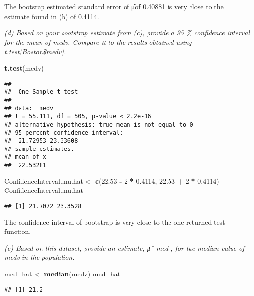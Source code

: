 \documentclass[]{article}
\newenvironment{Shaded}{\begin{snugshade}}{\end{snugshade}}
\newcommand{\KeywordTok}[1]{\textcolor[rgb]{0.13,0.29,0.53}{\textbf{#1}}}
\newcommand{\DecValTok}[1]{\textcolor[rgb]{0.00,0.00,0.81}{#1}}
\newcommand{\FloatTok}[1]{\textcolor[rgb]{0.00,0.00,0.81}{#1}}
\newcommand{\StringTok}[1]{\textcolor[rgb]{0.31,0.60,0.02}{#1}}
\newcommand{\OperatorTok}[1]{\textcolor[rgb]{0.81,0.36,0.00}{\textbf{#1}}}
\newcommand{\NormalTok}[1]{#1}
\begin{document}
The bootsrap estimated standard error of μ̂of 0.40881 is very close to
the estimate found in (b) of 0.4114.

\emph{(d) Based on your bootstrap estimate from (c), provide a 95 \%
confidence interval for the mean of medv. Compare it to the results
obtained using t.test(Boston\$medv).}

\begin{Shaded}
\begin{Highlighting}[]
\KeywordTok{t.test}\NormalTok{(medv)}
\end{Highlighting}
\end{Shaded}

\begin{verbatim}
## 
##  One Sample t-test
## 
## data:  medv
## t = 55.111, df = 505, p-value < 2.2e-16
## alternative hypothesis: true mean is not equal to 0
## 95 percent confidence interval:
##  21.72953 23.33608
## sample estimates:
## mean of x 
##  22.53281
\end{verbatim}

\begin{Shaded}
\begin{Highlighting}[]
\NormalTok{ConfidenceInterval.mu.hat <-}\StringTok{ }\KeywordTok{c}\NormalTok{(}\FloatTok{22.53} \OperatorTok{-}\StringTok{ }\DecValTok{2} \OperatorTok{*}\StringTok{ }\FloatTok{0.4114}\NormalTok{, }\FloatTok{22.53} \OperatorTok{+}\StringTok{ }\DecValTok{2} \OperatorTok{*}\StringTok{ }\FloatTok{0.4114}\NormalTok{)}
\NormalTok{ConfidenceInterval.mu.hat}
\end{Highlighting}
\end{Shaded}

\begin{verbatim}
## [1] 21.7072 23.3528
\end{verbatim}

The confidence interval of bootstrap is very close to the one returned
test function.

\emph{(e) Based on this dataset, provide an estimate, μˆ med , for the
median value of medv in the population. }

\begin{Shaded}
\begin{Highlighting}[]
\NormalTok{med_hat <-}\StringTok{ }\KeywordTok{median}\NormalTok{(medv)}
\NormalTok{med_hat}
\end{Highlighting}
\end{Shaded}

\begin{verbatim}
## [1] 21.2
\end{verbatim}
\end{document}

